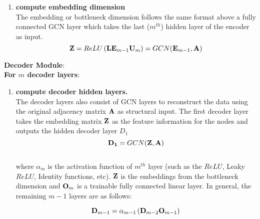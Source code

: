 \documentclass[a4paper,12pt]{article}
\newcommand{\forceindent}{\leavevmode{\parindent=2em\indent}}
\begin{document}
\begin{itemize}
\begin{enumerate}
{\begin{enumerate}
{					By considering $H_0 = X$, the $m-1^{th}$ encoder layer generates node
					representations in hidden layer $m-1$ as follows:
					
					\[ H_{m-1} = \sigma\left({\bf W}_m\cdot {\bf H}_{m-2}\right)\cdot {\bf \Theta}_{m-1}\] 
					Where ${\bf \Theta}_{m-1}$ is the matrix of attention coefficients for layer $m-1$
					}
					
					In linear form, the matrix of attention coefficients ${\bf \Theta}_{m-1}$ is computed as 
					\[{\bf \Theta}_{m-1} = \text{Softmax}\left(\sigma\left({\bf M}_s^{m-1} + {\bf M}_v^{m-1}\right)\right) \]
					\[{\bf M}_s^{m-1} = \]
					\[{\bf M}_v^{m-1} = \]
					
				\item[]{\textbf{compute embedding dimension} \\
					The embedding or bottleneck dimension follows the same format above a fully connected GCN layer which takes the last ($m^{th}$) hidden layer of the encoder as input.
					\[ {\bf Z} = ReLU\left(\mathit{\bf L}{\bf E}_{m-1}{\bf U}_{m}\right) = GCN({\bf E}_{m-1}, {\bf A}) \]} 
			\end{enumerate}
			\forceindent \textbf{Decoder Module}: \\
			\forceindent \textbf{For $m$ decoder layers}:
			\begin{enumerate}
				\item[]{\textbf{compute decoder hidden layers.}\\
					The decoder layers also consist of GCN layers to reconstruct the data using the original adjacency matrix ${\bf A}$ as structural input. The first decoder layer takes the embedding matrix $\bf Z$ as the feature information for the nodes and outputs the hidden decoder layer $D_1$ 
					\[ {\bf D_1} = GCN({\bf Z}, {\bf A})\]
					\\
					where $\alpha_m$ is the activation function of $m^{th}$ layer (such as the $ReLU$, Leaky $ReLU$, Identity functions, etc). $\bf Z$ is the embeddings from the bottleneck dimension and ${\bf O}_m$ is a trainable fully connected linear layer. In general, the remaining $m-1$ layers are as follows:
					
					\[{\bf D}_{m-1} = \alpha_{m-1}\left({\bf D}_{m-2}{\bf O}_{m-1}\right)\]}
				

\end{enumerate}}
\end{enumerate}
\end{itemize}
\end{document}
